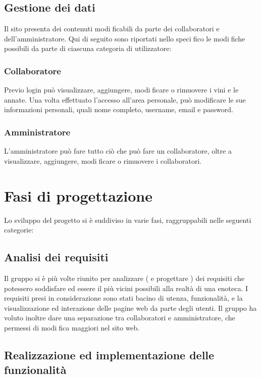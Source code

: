 \subsection{Gestione dei dati}

Il sito presenta dei contenuti modificabili da parte dei collaboratori e dell'amministratore. 
Qui di seguito sono riportati nello specifico le modifiche possibili da parte di ciascuna categoria di utilizzatore:

\subsubsection{Collaboratore}

Previo login può visualizzare, aggiungere, modificare o rimuovere i vini e le annate. 
Una volta effettuato l'accesso all'area personale, può modificare le sue
informazioni personali, quali nome completo, username, email e password.

\subsubsection{Amministratore}

L'amministratore può fare tutto ciò che può fare un collaboratore, oltre a 
visualizzare, aggiungere, modificare o rimuovere i collaboratori.


\section{Fasi di progettazione}

Lo sviluppo del progetto si è suddiviso in varie fasi, raggruppabili nelle seguenti
categorie:

\subsection{Analisi dei requisiti}

Il gruppo si è più volte riunito per analizzare ( e progettare ) dei requisiti che
potessero soddisfare ed essere il più vicini possibili alla realtà di una enoteca. 
I requisiti presi in considerazione sono stati bacino di utenza, funzionalità,
e la visualizzazione ed interazione delle pagine web da parte degli utenti. 
Il gruppo ha voluto inoltre dare una separazione tra collaboratori e amministratore, 
che permessi di modifica maggiori nel sito web. 

\subsection{Realizzazione ed implementazione delle funzionalità}

